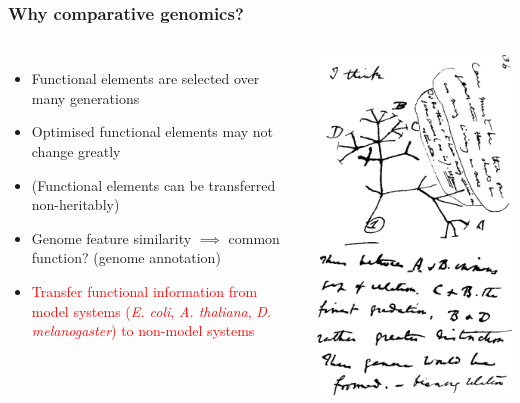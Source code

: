 %
\begin{frame}
  \frametitle{Why comparative genomics?}
    \begin{columns}[c] 
        \begin{itemize}
         \item \textcolor{hutton_green}{Functional elements are selected over many generations}
         \item \textcolor{hutton_purple}{Optimised functional elements may not change greatly}
         \item \textcolor{hutton_blue}{(Functional elements can be transferred non-heritably)}   
         \item \textcolor{RawSienna}{Genome feature similarity $\implies$ common function? (genome annotation)}
         \item \textcolor{red}{Transfer functional information from model systems (\textit{E. coli}, \textit{A. thaliana}, \textit{D. melanogaster}) to non-model systems}
        \end{itemize}
        \includegraphics[width=\textwidth]{images/darwin_tree}
    \end{columns}  
\end{frame}

